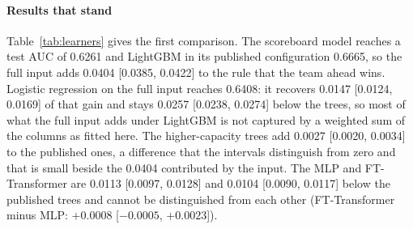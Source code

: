\paragraph{Results that stand}
Table~\ref{tab:learners} gives the first comparison. The scoreboard model reaches a test AUC of 0.6261 and
LightGBM in its published configuration 0.6665, so the full input adds 0.0404 [0.0385, 0.0422] to the
rule that the team ahead wins. Logistic regression on the full input reaches 0.6408: it recovers 0.0147
[0.0124, 0.0169] of that gain and stays 0.0257 [0.0238, 0.0274] below the trees, so most of what the full
input adds under LightGBM is not captured by a weighted sum of the columns as fitted here. The
higher-capacity trees add 0.0027 [0.0020, 0.0034] to the published ones, a difference that the intervals
distinguish from zero and that is small beside the 0.0404 contributed by the input. The MLP and
FT-Transformer are 0.0113 [0.0097, 0.0128] and 0.0104 [0.0090, 0.0117] below the published trees and
cannot be distinguished from each other (FT-Transformer minus MLP: $+0.0008$ [$-0.0005$, $+0.0023$]).

